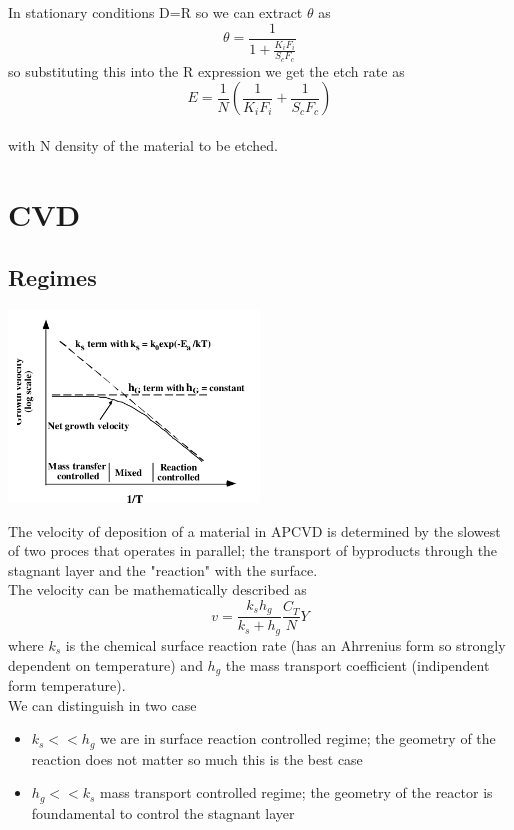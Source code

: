 In stationary conditions D=R so we can extract $\theta$ as
\begin{equation}
\theta=\frac{1}{1+\frac{K_iF_i}{S_cF_c}}
\end{equation}
so substituting this into the R expression we get the etch rate as 
\begin{equation}
E=\frac{1}{N}\left(\frac{1}{K_iF_i}+\frac{1}{S_cF_c}\right)
\end{equation}
\\
with N density of the material to be etched.\\


\section{CVD}

\subsection{Regimes}

\centering
\includegraphics[width=0.5\textwidth]{CVD.png}\\
\raggedright

The velocity of deposition of a material in APCVD is determined by the slowest of two proces that operates in parallel; the transport of byproducts through the stagnant layer and the "reaction" with the surface.\\
The velocity can be mathematically described as 
\begin{equation}
v=\frac{k_sh_g}{k_s+h_g}\frac{C_T}{N}Y
\end{equation}
where $k_s$ is the chemical surface reaction rate (has an Ahrrenius form so strongly dependent on temperature) and $h_g$ the mass transport coefficient (indipendent form temperature).\\
We can distinguish in two case 
\begin{itemize}
\item $k_s<<h_g$ we are in surface reaction controlled regime; the geometry of the reaction does not matter so much this is the best case
\item $h_g<<k_s$ mass transport controlled regime; the geometry of the reactor is foundamental to control the stagnant layer 
\end{itemize}



